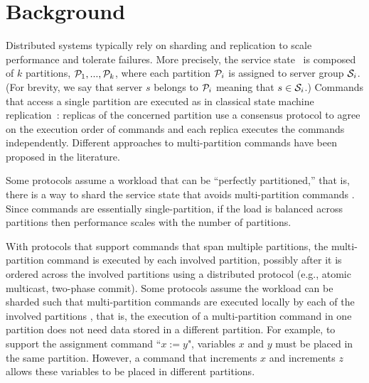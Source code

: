 \section{Background}
\label{sec:background}

Distributed systems typically rely on sharding and replication to scale performance and tolerate failures.
More precisely, the service state \vvt\ is composed of $k$ partitions, $\mathcal{P}_1, ..., \mathcal{P}_k$, where each partition $\mathcal{P}_i$ is assigned to server group $\mathcal{S}_i$. 
(For brevity, we say that server $s$ belongs to $\mathcal{P}_i$ meaning that $s \in \mathcal{S}_i$.)
Commands that access a single partition are executed as in classical state machine replication~\cite{Lam78,Sch90}: 
replicas of the concerned partition use a consensus protocol to agree on the execution order of commands and each replica executes the commands independently. 
%
%
Different approaches to multi-partition commands have been proposed in the literature.

Some protocols assume a workload that can be ``perfectly partitioned,'' that is, there is a way to shard the service state that avoids multi-partition commands \cite{hoang2016,Nogueira17}.
Since commands are essentially single-partition, if the load is balanced across partitions then performance scales with the number of partitions.

With protocols that support commands that span multiple partitions, the multi-partition command is executed by each involved partition, possibly after it is ordered across the involved partitions using a distributed protocol (e.g., atomic multicast, two-phase commit).
Some protocols assume the workload can be sharded such that multi-partition commands are executed locally by each of the involved partitions \cite{Mu2016}, that is, the execution of a multi-partition command in one partition does not need data stored in a different partition.
For example, to support the assignment command ``$x := y$", variables $x$ and $y$ must be placed in the same partition.
However, a command that increments $x$ and increments $z$ allows these variables to be placed in different partitions.

